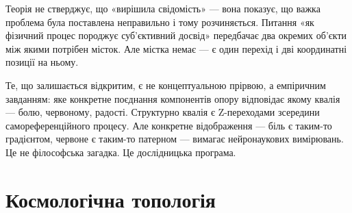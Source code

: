 \documentclass[12pt, a4paper, openany]{book}
\begin{document}
Теорія не стверджує, що «вирішила свідомість» — вона показує, що важка проблема була поставлена неправильно і тому розчиняється. Питання «як фізичний процес породжує суб'єктивний досвід» передбачає два окремих об'єкти між якими потрібен місток. Але містка немає — є один перехід і дві координатні позиції на ньому.

Те, що залишається відкритим, є не концептуальною прірвою, а емпіричним завданням: яке конкретне поєднання компонентів опору відповідає якому квалія — болю, червоному, радості. Структурно квалія є Z-переходами зсередини самореференційного процесу. Але конкретне відображення — біль є таким-то градієнтом, червоне є таким-то патерном — вимагає нейронаукових вимірювань. Це не філософська загадка. Це дослідницька програма.

\part{Космологічна топологія}
\end{document}
